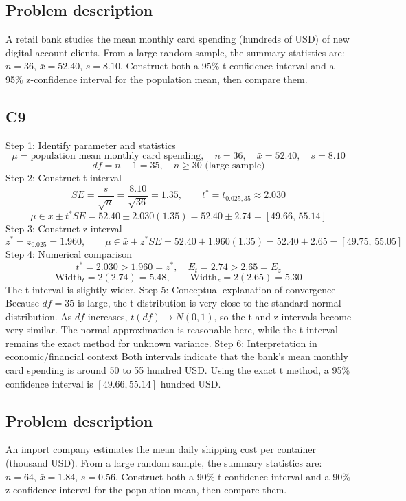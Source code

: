 

	\begin{ExamProblems}
		\item
		\subsection*{Problem description}
		A retail bank studies the mean monthly card spending (hundreds of USD) of new digital-account clients.
		From a large random sample, the summary statistics are: $n=36$, $\bar{x}=52.40$, $s=8.10$.
		Construct both a 95\% t-confidence interval and a 95\% z-confidence interval for the population mean, then compare them.
		
		\subsection*{C9}
		Step 1: Identify parameter and statistics
		\[
		\mu=\text{population mean monthly card spending},\quad n=36,\quad \bar{x}=52.40,\quad s=8.10
		\]
		\[
		df=n-1=35,\quad n\ge 30\text{ (large sample)}
		\]
		Step 2: Construct t-interval
		\[
		SE=\frac{s}{\sqrt{n}}=\frac{8.10}{\sqrt{36}}=1.35,\qquad t^*=t_{0.025,35}\approx 2.030
		\]
		\[
		\mu\in \bar{x}\pm t^*SE=52.40\pm 2.030(1.35)=52.40\pm 2.74=[49.66,\,55.14]
		\]
		Step 3: Construct z-interval
		\[
		z^*=z_{0.025}=1.960,\qquad \mu\in \bar{x}\pm z^*SE=52.40\pm 1.960(1.35)=52.40\pm 2.65=[49.75,\,55.05]
		\]
		Step 4: Numerical comparison
		\[
		t^*=2.030>1.960=z^*,\quad E_t=2.74>2.65=E_z
		\]
		\[
		\text{Width}_t=2(2.74)=5.48,\qquad \text{Width}_z=2(2.65)=5.30
		\]
		The t-interval is slightly wider.
		Step 5: Conceptual explanation of convergence
		Because $df=35$ is large, the t distribution is very close to the standard normal distribution.
		As $df$ increases, $t(df)\to N(0,1)$, so the t and z intervals become very similar.
		The normal approximation is reasonable here, while the t-interval remains the exact method for unknown variance.
		Step 6: Interpretation in economic/financial context
		Both intervals indicate that the bank's mean monthly card spending is around 50 to 55 hundred USD.
		Using the exact t method, a 95\% confidence interval is $[49.66,55.14]$ hundred USD.
		
		\newpage
		\item
		\subsection*{Problem description}
		An import company estimates the mean daily shipping cost per container (thousand USD).
		From a large random sample, the summary statistics are: $n=64$, $\bar{x}=1.84$, $s=0.56$.
		Construct both a 90\% t-confidence interval and a 90\% z-confidence interval for the population mean, then compare them.
		

\end{ExamProblems}
